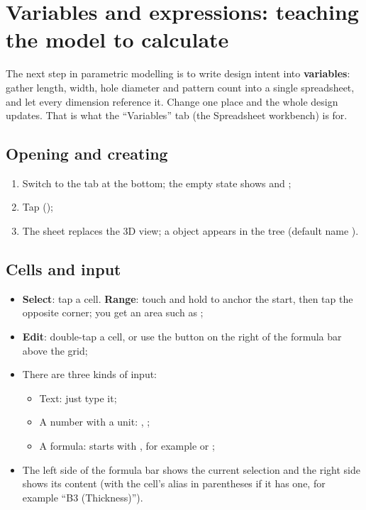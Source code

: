 \chapter{Variables and expressions: teaching the model to calculate}

The next step in parametric modelling is to write design intent into \textbf{variables}: gather length,
width, hole diameter and pattern count into a single spreadsheet, and let every dimension reference it.
Change one place and the whole design updates. That is what the ``Variables'' tab (the Spreadsheet
workbench) is for.

\section{Opening and creating}

\begin{enumerate}
  \item Switch to the  tab at the bottom; the empty state shows  and
        ;
  \item Tap  ();
  \item The sheet replaces the 3D view; a  object appears in the tree (default name
        ).
\end{enumerate}

\section{Cells and input}

\begin{itemize}
  \item \textbf{Select}: tap a cell. \textbf{Range}: touch and hold to anchor the start, then tap the
        opposite corner; you get an area such as ;
  \item \textbf{Edit}: double-tap a cell, or use the  button on the right of the formula bar
        above the grid;
  \item There are three kinds of input:
    \begin{itemize}
      \item Text: just type it;
      \item A number with a unit: \file{25 mm}, ;
      \item A formula: starts with \file{=}, for example  or ;
    \end{itemize}
  \item The left side of the formula bar shows the current selection and the right side shows its content
        (with the cell's alias in parentheses if it has one, for example ``B3 (Thickness)'').
\end{itemize}

